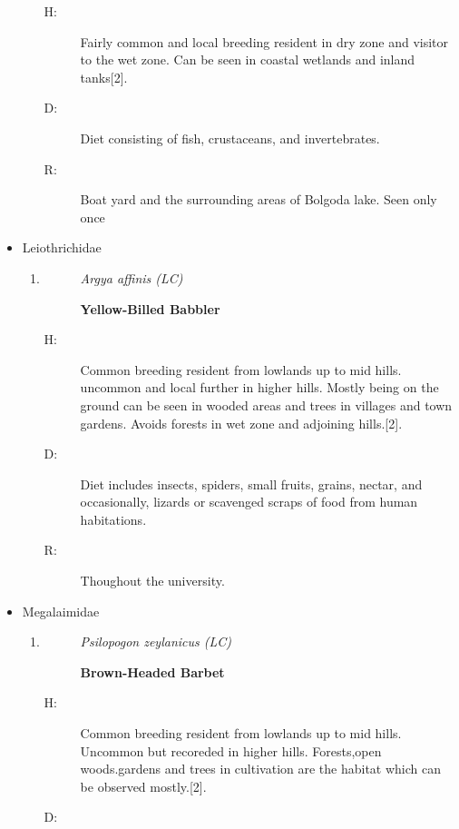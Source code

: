 \begin{itemize}
\begin{enumerate}
\begin{description}%
\item[H: ]%
Fairly common and local breeding resident in dry zone and visitor to the wet zone. Can be seen in coastal wetlands and inland tanks{[}2{]}.%
\item[D: ]%
Diet consisting of fish, crustaceans, and invertebrates.%
\item[R: ]%
Boat yard and the surrounding areas of Bolgoda lake. Seen only once%
\end{description}%
\end{enumerate}%
\item%
Leiothrichidae%
\begin{enumerate}%
\item%
\begin{description}%
\item[]%
\textit{Argya affinis (LC)}%
\item[]%
\textbf{Yellow{-}Billed Babbler}%
\end{description}%
\begin{description}%
\item[H: ]%
Common breeding resident from lowlands up to mid hills. uncommon and local further in higher hills. Mostly being on the ground can be seen in wooded areas and trees in villages and town gardens. Avoids forests in wet zone and adjoining hills.{[}2{]}.%
\item[D: ]%
Diet includes insects, spiders, small fruits, grains, nectar, and occasionally, lizards or scavenged scraps of food from human habitations.%
\item[R: ]%
Thoughout the university.%
\end{description}%
\end{enumerate}%
\item%
Megalaimidae%
\begin{enumerate}%
\item%
\begin{description}%
\item[]%
\textit{Psilopogon zeylanicus (LC)}%
\item[]%
\textbf{Brown{-}Headed Barbet}%
\end{description}%
\begin{description}%
\item[H: ]%
Common breeding resident from lowlands up to mid hills. Uncommon but recoreded in higher hills. Forests,open woods.gardens and trees in cultivation are the habitat which can be observed mostly.{[}2{]}.%
\item[D: ]%

\end{description}
\end{enumerate}
\end{itemize}
